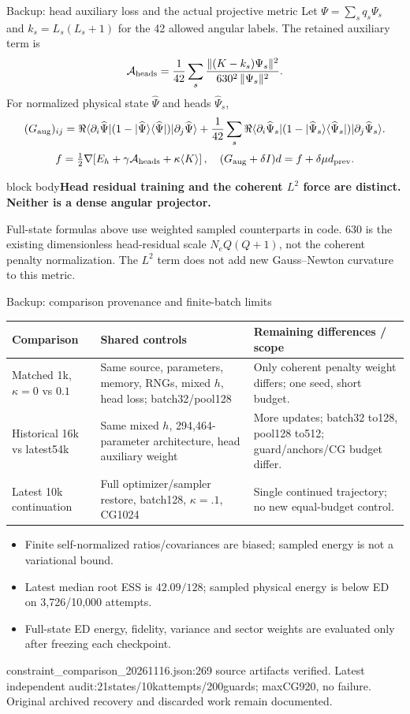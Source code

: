 \documentclass[aspectratio=169,10pt]{beamer}
\newcommand{\src}[1]{\vfill{\fontsize{6.3}{7.5}\selectfont\color{muted}#1\par}}
\newcommand{\take}[1]{\vspace{1mm}\begin{beamercolorbox}[sep=1.6mm,wd=\textwidth]{block body}\small\color{teal}\textbf{#1}\end{beamercolorbox}}
\newcommand{\ket}[1]{\lvert #1\rangle}
\newcommand{\bra}[1]{\langle #1\rvert}
\begin{document}
\begin{frame}{Backup: head auxiliary loss and the actual projective metric}
\small Let $\Psi=\sum_s q_s\Psi_s$ and $k_s=L_s(L_s+1)$ for the 42 allowed angular labels. The retained auxiliary term is
\[
\mathcal A_{\rm heads}=
\frac1{42}\sum_s
\frac{\|(K-k_s)\Psi_s\|^2}{630^2\,\|\Psi_s\|^2}.
\]
For normalized physical state $\widehat\Psi$ and heads $\widehat\Psi_s$,
\[
(G_{\rm aug})_{ij}=
\Re\langle\partial_i\widehat\Psi|
(1-\ket{\widehat\Psi}\bra{\widehat\Psi})
|\partial_j\widehat\Psi\rangle
+\frac1{42}\sum_s
\Re\langle\partial_i\widehat\Psi_s|
(1-\ket{\widehat\Psi_s}\bra{\widehat\Psi_s})
|\partial_j\widehat\Psi_s\rangle.
\]
\[
f=\tfrac12\nabla\!\left[E_h+\gamma\mathcal A_{\rm heads}
+\kappa\langle K\rangle\right],\quad
(G_{\rm aug}+\delta I)d=f+\delta\mu d_{\rm prev}.
\]
\take{Head residual training and the coherent $L^2$ force are distinct. Neither is a dense angular projector.}
\src{Full-state formulas above use weighted sampled counterparts in code. 630 is the existing dimensionless head-residual scale $N_eQ(Q+1)$, not the coherent penalty normalization. The $L^2$ term does not add new Gauss--Newton curvature to this metric.}
\end{frame}

\begin{frame}{Backup: comparison provenance and finite-batch limits}
\small\renewcommand{\arraystretch}{1.25}
\begin{tabular}{@{}L{.25\textwidth}L{.32\textwidth}L{.34\textwidth}@{}}\toprule
Comparison & Shared controls & Remaining differences / scope\\\midrule
Matched 1k, $\kappa=0$ vs $0.1$
& Same source, parameters, memory, RNGs, mixed $h$, head loss; batch32/pool128
& Only coherent penalty weight differs; one seed, short budget.\\
Historical 16k vs latest54k
& Same mixed $h$, 294,464-parameter architecture, head auxiliary weight
& More updates; batch32 to128, pool128 to512; guard/anchors/CG budget differ.\\
Latest 10k continuation
& Full optimizer/sampler restore, batch128, $\kappa=.1$, CG1024
& Single continued trajectory; no new equal-budget control.\\\bottomrule
\end{tabular}
\par\medskip
\begin{itemize}\setlength\itemsep{4pt}
\item Finite self-normalized ratios/covariances are biased; sampled energy is not a variational bound.
\item Latest median root ESS is $42.09/128$; sampled physical energy is below ED on 3,726/10,000 attempts.
\item Full-state ED energy, fidelity, variance and sector weights are evaluated only after freezing each checkpoint.
\end{itemize}
\src{constraint\_comparison\_20261116.json:269 source artifacts verified. Latest independent audit:21states/10kattempts/200guards; maxCG920, no failure. Original archived recovery and discarded work remain documented.}
\end{frame}
\end{document}
